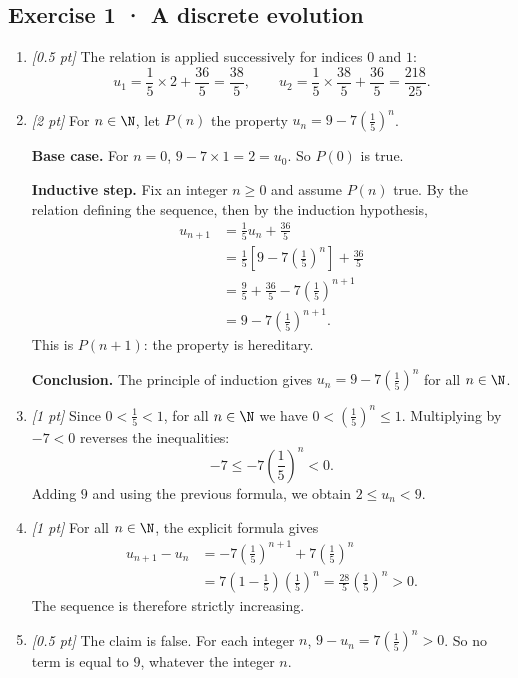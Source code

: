 \subsection*{Exercise 1 · A discrete evolution}\begin{enumerate}

\item \textit{[0.5 pt]} The relation is applied successively for indices $0$ and $1$:\[u_1=\frac{1}{5}\times 2+\frac{36}{5}=\frac{38}{5},\qquad u_2=\frac{1}{5}\times \frac{38}{5}+\frac{36}{5}=\frac{218}{25}.\]

\item \textit{[2 pt]} For $n\in\N$, let $P(n)$ the property $u_n=9-7\left(\frac{1}{5}\right)^n$.
\par\smallskip\textbf{Base case.} For $n=0$, $9-7\times1=2=u_0$. So $P(0)$ is true.
\par\smallskip\textbf{Inductive step.} Fix an integer $n\ge0$ and assume $P(n)$ true. By the relation defining the sequence, then by the induction hypothesis,
\[\begin{aligned}u_{n+1}&=\frac{1}{5}u_n+\frac{36}{5}\\
&=\frac{1}{5}\left[9-7\left(\frac{1}{5}\right)^n\right]+\frac{36}{5}\\
&=\frac{9}{5}+\frac{36}{5}-7\left(\frac{1}{5}\right)^{n+1}\\
&=9-7\left(\frac{1}{5}\right)^{n+1}.
\end{aligned}\]
This is $P(n+1)$: the property is hereditary.
\par\smallskip\textbf{Conclusion.} The principle of induction gives $u_n=9-7\left(\frac{1}{5}\right)^n$ for all $n\in\N$.

\item \textit{[1 pt]} Since $0<\frac{1}{5}<1$, for all $n\in\N$ we have $0<(\frac{1}{5})^n\le1$. Multiplying by $-7<0$ reverses the inequalities:
\[-7\le-7(\frac{1}{5})^n<0.\]
Adding $9$ and using the previous formula, we obtain $2\le u_n<9$.

\item \textit{[1 pt]} For all $n\in\N$, the explicit formula gives
\[\begin{aligned}u_{n+1}-u_n&=-7(\frac{1}{5})^{n+1}+7(\frac{1}{5})^n\\&=7(1-\frac{1}{5})(\frac{1}{5})^n=\frac{28}{5}(\frac{1}{5})^n>0.\end{aligned}\]
The sequence is therefore strictly increasing.

\item \textit{[0.5 pt]} The claim is false. For each integer $n$, $9-u_n=7(\frac{1}{5})^n>0$. So no term is equal to $9$, whatever the integer $n$.

\end{enumerate}


